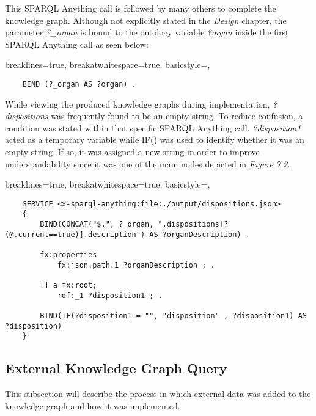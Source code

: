 This SPARQL Anything call is followed by many others to complete the knowledge graph. Although not explicitly stated in the \textit{Design} chapter, the parameter \textit{?\_organ} is bound to the ontology variable \textit{?organ} inside the first SPARQL Anything call as seen below:

\lstset
{
    breaklines=true,
    breakatwhitespace=true,
    basicstyle=\linespread{1.5}\ttfamily,
}
\begin{lstlisting}
    BIND (?_organ AS ?organ) .
\end{lstlisting}

While viewing the produced knowledge graphs during implementation, \textit{?dispositions} was frequently found to be an empty string. To reduce confusion, a condition was stated within that specific SPARQL Anything call. \textit{?disposition1} acted as a temporary variable while IF() was used to identify whether it was an empty string. If so, it was assigned a new string in order to improve understandability since it was one of the main nodes depicted in \textit{Figure 7.2}. 

\lstset
{
    breaklines=true,
    breakatwhitespace=true,
    basicstyle=\linespread{1.25}\ttfamily,
}
\begin{lstlisting}
    SERVICE <x-sparql-anything:file:./output/dispositions.json>
    {
        BIND(CONCAT("$.", ?_organ, ".dispositions[?(@.current==true)].description") AS ?organDescription) .
    
        fx:properties
            fx:json.path.1 ?organDescription ; .
    
        [] a fx:root; 
            rdf:_1 ?disposition1 ; .
    
        BIND(IF(?disposition1 = "", "disposition" , ?disposition1) AS ?disposition)
    } 
\end{lstlisting}

\subsection{External Knowledge Graph Query}
\hspace*{0.5cm} This subsection will describe the process in which external data was added to the knowledge graph and how it was implemented. 

